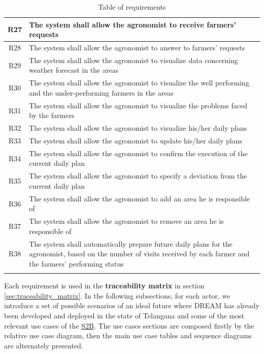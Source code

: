 \begin{center}
\begin{longtable}{|c|m{}|}
            \textsc{R27}  &    The system shall allow the agronomist to receive farmers' requests  \\
            \hline
            \textsc{R28}  &    The system shall allow the agronomist to answer to farmers' requests  \\
            \hline
            \textsc{R29}  &    The system shall allow the agronomist to visualize data concerning weather forecast in the areas  \\
            \hline
            \textsc{R30}  &    The system shall allow the agronomist to visualize the well performing and the under-performing farmers in the areas  \\
            \hline
            \textsc{R31}  &    The system shall allow the agronomist to visualize the problems faced by the farmers  \\
            \hline
            \textsc{R32}  &    The system shall allow the agronomist to visualize his/her daily plans  \\
            \hline
            \textsc{R33}  &    The system shall allow the agronomist to update his/her daily plans  \\
            \hline
            \textsc{R34}  &    The system shall allow the agronomist to confirm the execution of the current daily plan  \\
            \hline
            \textsc{R35}  &    The system shall allow the agronomist to specify a deviation from the current daily plan  \\
            \hline
            \textsc{R36}  &    The system shall allow the agronomist to add an area he is responsible of  \\
            \hline
            \textsc{R37}  &    The system shall allow the agronomist to remove an area he is responsible of  \\
            \hline
            \textsc{R38}  &    The system shall automatically prepare future daily plans for the agronomist, based on the number of visits received by each farmer and the farmers' performing status  \\
            \hline
        
        \rowcolor{white}\caption{\label{tab:requirements}Table of requirements}
        
    \end{longtable}
\end{center}

Each requirement is used in the \textbf{traceability matrix} in section \ref{sec:traceability_matrix}.
In the following subsections, for each actor, we introduce a set of possible scenarios of an ideal future where DREAM has already been developed and deployed in the state of Telangana and some of the most relevant use cases of the \hyperref[tab:acronymsTable]{S2B}. The use cases sections are composed firstly by the relative use case diagram, then the main use case tables and sequence diagrams are alternately presented.


